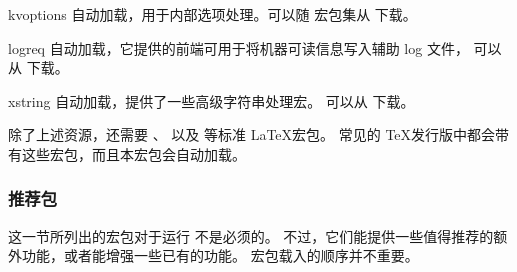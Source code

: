 \begin{marglist}
\item[kvoptions]
自动加载，用于内部选项处理。可以随  宏包集从  下载。

\item[logreq]
自动加载，它提供的前端可用于将机器可读信息写入辅助 log 文件，
可以从  下载。

\item[xstring]
自动加载，提供了一些高级字符串处理宏。
可以从  下载。

\end{marglist}


除了上述资源，\biblatex 还需要 、 以及  等标准 \LaTeX 宏包。
常见的 \TeX 发行版中都会带有这些宏包，而且本宏包会自动加载。

\subsubsection{推荐包}
\label{int:pre:rec}


这一节所列出的宏包对于运行 \biblatex 不是必须的。
不过，它们能提供一些值得推荐的额外功能，或者能增强一些已有的功能。
宏包载入的顺序并不重要。

